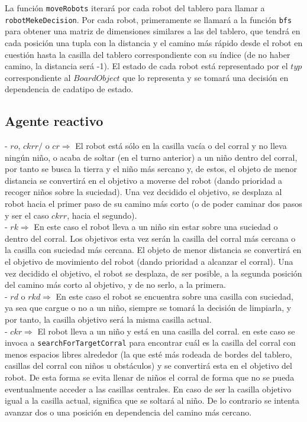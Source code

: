 \documentclass[a4paper,12pt]{article}
\def\code#1{\texttt{#1}}
\begin{document}
La función \code{moveRobots} iterará por cada robot del tablero para llamar a \code{robotMekeDecision}. Por cada robot, primeramente se llamará a la función \code{bfs} para obtener una matriz de dimensiones similares a las del tablero, que tendrá en cada posición una tupla con la distancia y el camino más rápido desde el robot en cuestión hasta la casilla del tablero correspondiente con su índice (de no haber camino, la distancia será -1). El estado de cada robot está representado por el $typ$ correspondiente al $BoardObject$ que lo representa y se tomará una decisión en dependencia de cadatipo de estado. \\

\subsection*{Agente reactivo}
- $ro$, $ckrr/$ o $cr \Longrightarrow$ El robot está sólo en la casilla vacía o del corral  y no lleva ningún niño, o acaba de soltar (en el turno anterior) a un niño dentro del corral, por tanto se busca la tierra y el niño más sercano y, de estos, el objeto de menor distancia se convertirá en el objetivo a moverse del robot (dando prioridad a recoger niños sobre la suciedad). Una vez decidido el objetivo, se desplaza al robot hacia el primer paso de su camino más corto (o de poder caminar dos pasos y ser el caso $ckrr$, hacia el segundo).\\
- $rk \Longrightarrow$ En este caso el robot lleva a un niño sin estar sobre una suciedad o dentro del corral. Los objetivos esta vez serán la casilla del corral más cercana o la casilla con suciedad más cercana. El objeto de menor distancia se convertirá en el objetivo de movimiento del robot (dando prioridad a alcanzar el corral). Una vez decidido el objetivo, el robot se desplaza, de ser posible, a la segunda posición del camino más corto al objetivo, y de no serlo, a la primera.\\
- $rd$ o $rkd \Longrightarrow$ En este caso el robot se encuentra sobre una casilla con suciedad, ya sea que cargue o no a un niño, siempre se tomará la decisión de limpiarla, y por tanto, la casilla objetivo será la misma casilla actual.\\
- $ckr \Longrightarrow$ El robot lleva a un niño y está en una casilla del corral. en este caso se invoca a \code{searchForTargetCorral} para encontrar cuál es la casilla del corral con menos espacios libres alrededor (la que esté más rodeada de bordes del tablero, casillas del corral con niños u obstáculos) y se convertirá esta en el objetivo del robot. De esta forma se evita llenar de niños el corral de forma que no se pueda eventualmente acceder a las casillas centrales. En caso de ser la casilla objetivo igual a la casilla actual, significa que se soltará al niño. De lo contrario se intenta avanzar dos o una posición en dependencia del camino más cercano.\\
\end{document}
